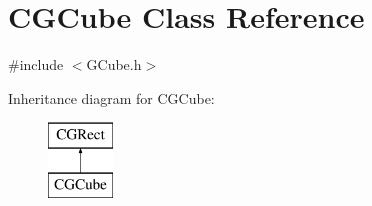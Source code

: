 \hypertarget{class_c_g_cube}{}\section{C\+G\+Cube Class Reference}
\label{class_c_g_cube}


{\ttfamily \#include $<$G\+Cube.\+h$>$}

Inheritance diagram for C\+G\+Cube\+:\begin{figure}[H]
\begin{center}
\leavevmode
\includegraphics[height=2.000000cm]{class_c_g_cube}
\end{center}
\end{figure}
